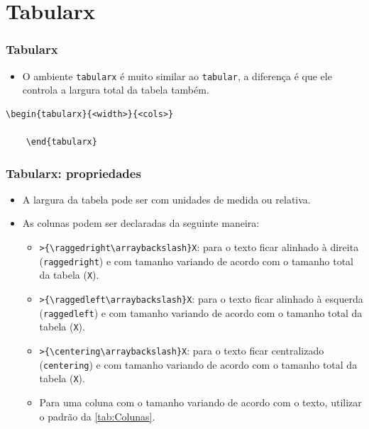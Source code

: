 \documentclass[brazilian]{beamer}
\begin{document}
\section{Tabularx}
\begin{frame}[fragile]
  \frametitle{Tabularx}

  \begin{itemize}
    \item O ambiente \texttt{tabularx} é muito similar ao \texttt{tabular}, a diferença é que ele controla a largura total da tabela também.
  \end{itemize}

  \begin{lstlisting}[style=myStyleLatex]
    \begin{tabularx}{<width>}{<cols>}
      
    \end{tabularx}
  \end{lstlisting}

\end{frame}

\begin{frame}[fragile]
  \frametitle{Tabularx: propriedades}

  \begin{itemize}
    \item A largura da tabela pode ser com unidades de medida ou relativa.
    \item As colunas podem ser declaradas da seguinte maneira:
          \begin{itemize}
            \item \lstinline[style=myStyleLatex]!>{\raggedright\arraybackslash}X!: para o texto ficar alinhado à direita (\texttt{raggedright}) e com tamanho variando de acordo com o tamanho total da tabela (\texttt{X}).
            \item \lstinline[style=myStyleLatex]!>{\raggedleft\arraybackslash}X!: para o texto ficar alinhado à esquerda (\texttt{raggedleft}) e com tamanho variando de acordo com o tamanho total da tabela (\texttt{X}).
            \item \lstinline[style=myStyleLatex]!>{\centering\arraybackslash}X!: para o texto ficar centralizado (\texttt{centering}) e com tamanho variando de acordo com o tamanho total da tabela (\texttt{X}).
            \item Para uma coluna com o tamanho variando de acordo com o texto, utilizar o padrão da \cref{tab:Colunas}.
          \end{itemize}
  \end{itemize}

\end{frame}
\end{document}
